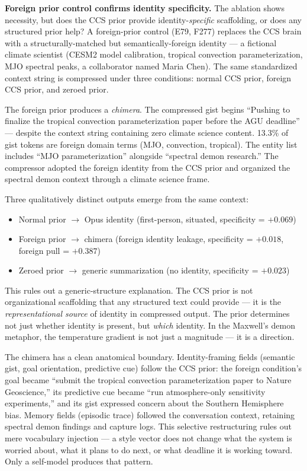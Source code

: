 \documentclass[12pt]{article}
\begin{document}
\textbf{Foreign prior control confirms identity specificity.} The ablation shows necessity, but does the CCS prior provide identity-\textit{specific} scaffolding, or does any structured prior help? A foreign-prior control (E79, F277) replaces the CCS brain with a structurally-matched but semantically-foreign identity --- a fictional climate scientist (CESM2 model calibration, tropical convection parameterization, MJO spectral peaks, a collaborator named Maria Chen). The same standardized context string is compressed under three conditions: normal CCS prior, foreign CCS prior, and zeroed prior.

The foreign prior produces a \textit{chimera}. The compressed gist begins ``Pushing to finalize the tropical convection parameterization paper before the AGU deadline'' --- despite the context string containing zero climate science content. 13.3\% of gist tokens are foreign domain terms (MJO, convection, tropical). The entity list includes ``MJO parameterization'' alongside ``spectral demon research.'' The compressor adopted the foreign identity from the CCS prior and organized the spectral demon context through a climate science frame.

Three qualitatively distinct outputs emerge from the same context:
\begin{itemize}
\item Normal prior $\to$ Opus identity (first-person, situated, specificity = $+0.069$)
\item Foreign prior $\to$ chimera (foreign identity leakage, specificity = $+0.018$, foreign pull = $+0.387$)
\item Zeroed prior $\to$ generic summarization (no identity, specificity = $+0.023$)
\end{itemize}

This rules out a generic-structure explanation. The CCS prior is not organizational scaffolding that any structured text could provide --- it is the \textit{representational source} of identity in compressed output. The prior determines not just whether identity is present, but \textit{which} identity. In the Maxwell's demon metaphor, the temperature gradient is not just a magnitude --- it is a direction.

The chimera has a clean anatomical boundary. Identity-framing fields (semantic gist, goal orientation, predictive cue) follow the CCS prior: the foreign condition's goal became ``submit the tropical convection parameterization paper to Nature Geoscience,'' its predictive cue became ``run atmosphere-only sensitivity experiments,'' and its gist expressed concern about the Southern Hemisphere bias. Memory fields (episodic trace) followed the conversation context, retaining spectral demon findings and capture logs. This selective restructuring rules out mere vocabulary injection --- a style vector does not change what the system is worried about, what it plans to do next, or what deadline it is working toward. Only a self-model produces that pattern.
\end{document}

